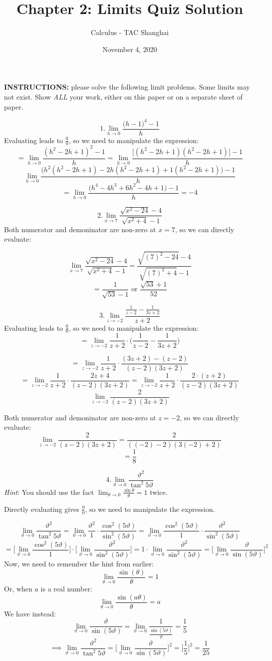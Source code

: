 \documentclass[fleqn]{article}
\author{Calculus - TAC Shanghai}
\title{Chapter 2: Limits Quiz Solution}
\date{November 4, 2020}
\begin{document}
\maketitle
\textbf{INSTRUCTIONS:} please solve the following limit problems. Some limits may not exist.
Show \textit{ALL} your work, either on this paper or on a separate sheet of paper.


\[1.\lim_{h\to0}\frac{\big(h-1\big)^4-1}{h} \]
Evaluating leads to $\frac{0}{0}$, so we need to manipulate the expression:
\[= \lim_{h\to0}\frac{(h^2-2h+1)^2-1}{h}=\lim_{h\to0}{\frac{\big[(h^2-2h+1)(h^2-2h+1)\big]-1}{h}}\]
\[\lim_{h\to0}\frac{\big(h^2(h^2-2h+1)-2h(h^2-2h+1)+1(h^2-2h+1)\big)-1}{h}\]
\[=\lim_{h\to0}\frac{\big(h^4-4h^3+6h^2-4h+1\big)-1}{h}=-4\]

\[2.\lim_{x\to7}\frac{\sqrt{x^2-24}-4}{\sqrt{x^2+4}-1}\]
Both numerator and demoninator are non-zero at $x=7$, so we can directly evaluate:

\[\lim_{x\to7}\frac{\sqrt{x^2-24}-4}{\sqrt{x^2+4}-1}=\frac{\sqrt{(7)^2-24}-4}{\sqrt{(7)^2+4}-1}\]
\[=\frac{1}{\sqrt{53}-1} \text{ or } \frac{\sqrt{53}+1}{52}\]


\[3.\lim_{z\to-2}\frac{\frac{1}{z-2}-\frac{1}{3z+2}}{z+2}\]
Evaluating leads to $\frac{0}{0}$, so we need to manipulate the expression:
\[=\lim_{z\to-2}\frac{1}{z+2}\cdot\big(\frac{1}{z-2}-\frac{1}{3z+2}\big)\]

\[=\lim_{z\to-2}\frac{1}{z+2}\cdot\frac{(3z+2)-(z-2)}{(z-2)(3z+2)}\]
\[=\lim_{z\to-2}\frac{1}{z+2}\cdot\frac{2z+4}{(z-2)(3z+2)}=\lim_{z\to-2}\frac{1}{z+2}\cdot\frac{2\cdot(z+2)}{(z-2)(3z+2)}\]
\[\lim_{z\to-2}\frac{2}{(z-2)(3z+2)}\]

Both numerator and demoninator are non-zero at $z=-2$, so we can directly evaluate:
\[\lim_{z\to-2}\frac{2}{(z-2)(3z+2)}=\frac{2}{((-2)-2)(3(-2)+2)}\]
\[=\frac{1}{8}\]

\[4.\lim_{\vartheta\to0}\frac{\vartheta^2}{\tan^2 5\vartheta}\]
\textit{Hint}: You should use the fact $ \lim_{\theta\to0}\frac{\sin\theta}{\theta}=1 $ twice.

Directly evaluating gives $\frac{0}{0}$, so we need to manipulate the expression.

\[\lim_{\vartheta\to0}\frac{\vartheta^2}{\tan^2 5\vartheta}=\lim_{\vartheta\to0}\frac{\vartheta^2}{1}\cdot\frac{\cos^2(5\vartheta)}{\sin^2(5\vartheta)}=\lim_{\vartheta\to0}\frac{\cos^2(5\vartheta)}{1}\cdot\frac{\vartheta^2}{\sin^2(5\vartheta)}\]
\[=\big[\lim_{\vartheta\to0}\frac{\cos^2(5\vartheta)}{1}\big]\cdot\big[\lim_{\vartheta\to0}\frac{\vartheta^2}{\sin^2(5\vartheta)}]=1\cdot\lim_{\vartheta\to0}\frac{\vartheta^2}{\sin^2(5\vartheta)}=\bigg[\lim_{\vartheta\to0}\frac{\vartheta}{\sin(5\vartheta)}\bigg]^2\]
Now, we need to remember the hint from earlier:
\[\lim_{\theta\to0}\frac{\sin(\theta)}{\theta}=1\]
Or, when $a$ is a real number:
\[\lim_{\theta\to0}\frac{\sin(a\theta)}{\theta}=a\]
We have instead:
\[\lim_{\vartheta\to0}\frac{\vartheta}{\sin(5\vartheta)}=\lim_{\vartheta\to0}\frac{1}{\frac{\sin(5\vartheta)}{\vartheta}}=\frac{1}{5}\]
\[\implies\lim_{\vartheta\to0}\frac{\vartheta^2}{\tan^2 5\vartheta}=\bigg[\lim_{\vartheta\to0}\frac{\vartheta}{\sin(5\vartheta)}\bigg]^2=\bigg[\frac{1}{5}\bigg]^2=\frac{1}{25}\]
\end{document}
